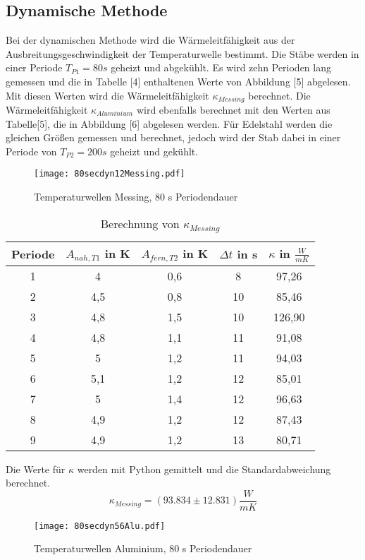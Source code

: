 \subsection{Dynamische Methode}
Bei der dynamischen Methode wird die Wärmeleitfähigkeit aus der Ausbreitungsgeschwindigkeit der Temperaturwelle bestimmt.
Die Stäbe werden in einer Periode $T_{P1} = 80 s $ geheizt und abgekühlt.
Es wird zehn Perioden lang gemessen und die in Tabelle [4] enthaltenen Werte von Abbildung [5] abgelesen.
Mit diesen Werten wird die Wärmeleitfähigkeit $\kappa_{Messing}$ berechnet.
Die Wärmeleitfähigkeit $\kappa_{Aluminium}$ wird ebenfalls berechnet mit den Werten aus Tabelle[5], die in Abbildung [6] abgelesen werden.
Für Edelstahl werden die gleichen Größen gemessen und berechnet, jedoch wird der Stab dabei in einer Periode von $T_{P2} = 200 s$ geheizt und gekühlt.
\begin{figure}[H]
  \centering
  \texttt{[image: 80secdyn12Messing.pdf]}
  \caption{Temperaturwellen Messing, 80 s Periodendauer}
  \label{fig:5}
\end{figure}
\begin{table}[H]
  \centering
  \caption{Berechnung von $\kappa_{Messing}$}
  \label{tab:4}
  \begin{tabular}{c c c c c}
    \toprule
   Periode &   $A_{nah,T1}$ in K &  $A_{fern,T2}$ in K &  $\Delta t$ in s & $\kappa$ in $\frac{W}{mK}$ \\
    \midrule
    1 & 4 & 0,6 & 8 & 97,26 \\
    2 & 4,5 & 0,8 & 10 & 85,46 \\
    3 & 4,8 & 1,5 & 10 & 126,90 \\
    4 & 4,8 & 1,1 & 11 & 91,08 \\
    5 & 5 & 1,2 & 11 & 94,03 \\
    6 & 5,1 & 1,2 & 12 & 85,01 \\
    7 & 5 & 1,4 & 12 & 96,63 \\
    8 & 4,9 & 1,2 & 12 & 87,43 \\
    9 & 4,9 & 1,2 & 13 & 80,71 \\
    \bottomrule
  \end{tabular}
\end{table}
Die Werte für $\kappa $ werden mit Python gemittelt und die Standardabweichung berechnet. $$\kappa_{Messing} =(93.834 \pm 12.831) \frac{W}{mK}$$
\begin{figure}[H]
  \centering
  \texttt{[image: 80secdyn56Alu.pdf]}
  \caption{Temperaturwellen Aluminium, 80 s Periodendauer}
  \label{fig:6}
\end{figure}
